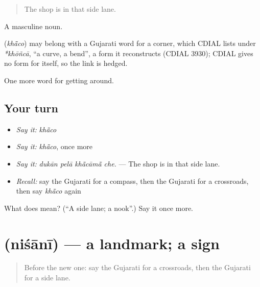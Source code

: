 \begin{quote}
The shop is in that side lane.
\end{quote}

A masculine noun.

\begin{cousinweb}
\textbf{} (\emph{khā̃co}) may belong with a Gujarati word for a corner, which CDIAL lists under \emph{*khōñcā}, \textquotedblleft{}a curve, a bend\textquotedblright{}, a form it reconstructs (CDIAL 3930); CDIAL gives no form for  itself, so the link is hedged.
\end{cousinweb}

\begin{grammarlens}[title={What you've built}]
One more word for getting around.
\end{grammarlens}

\subsection*{Your turn}
\begin{itemize}
\raggedright
  \item \emph{Say it:} \emph{khā̃co}
  \item \emph{Say it:} \emph{khā̃co}, once more
  \item \emph{Say it:} \emph{dukān pelā khā̃cāmā̃ che.} — The shop is in that side lane.
  \item \emph{Recall:} say the Gujarati for a compass, then the Gujarati for a crossroads, then say \emph{khā̃co} again
\end{itemize}

\begin{tcolorbox}[breakable,colback=teal!4,colframe=teal!35!black,title={Before you move on}]
What does  mean? (\textquotedblleft{}A side lane; a nook\textquotedblright{}.) Say it once more.
\end{tcolorbox}
\section[\texorpdfstring{\gu{નિશાની} (niśānī)}{નિશાની (niśānī)}]{ (niśānī) — a landmark; a sign}

\label{lesson:GU-C415-nisani}



\begin{quote}
Before the new one: say the Gujarati for a crossroads, then the Gujarati for a side lane.
\end{quote}

